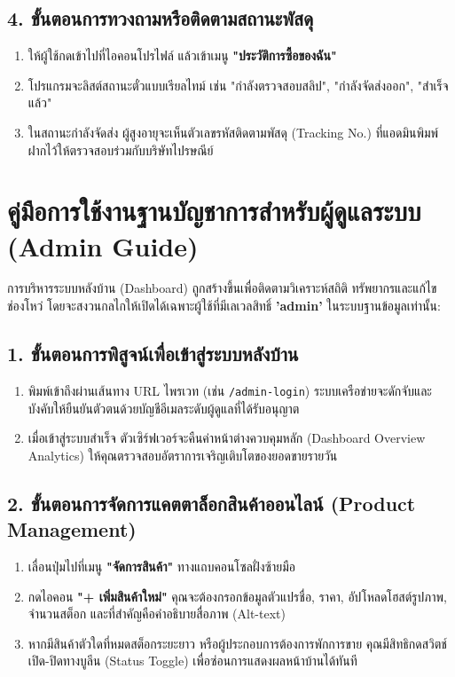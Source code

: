\subsection{4. ขั้นตอนการทวงถามหรือติดตามสถานะพัสดุ}
\begin{enumerate}
    \item ให้ผู้ใช้กดเข้าไปที่ไอคอนโปรไฟล์ แล้วเข้าเมนู \textbf{"ประวัติการซื้อของฉัน"}
    \item โปรแกรมจะลิสต์สถานะตั๋วแบบเรียลไทม์ เช่น "กำลังตรวจสอบสลิป", "กำลังจัดส่งออก", "สำเร็จแล้ว" 
    \item ในสถานะกำลังจัดส่ง ผู้สูงอายุจะเห็นตัวเลขรหัสติดตามพัสดุ (Tracking No.) ที่แอดมินพิมพ์ฝากไว้ให้ตรวจสอบร่วมกับบริษัทไปรษณีย์
\end{enumerate}

\section{คู่มือการใช้งานฐานบัญชาการสำหรับผู้ดูแลระบบ (Admin Guide)}
การบริหารระบบหลังบ้าน (Dashboard) ถูกสร้างขึ้นเพื่อติดตามวิเคราะห์สถิติ ทรัพยากรและแก้ไขช่องโหว่ โดยจะสงวนกลไกให้เปิดได้เฉพาะผู้ใช้ที่มีเลเวลสิทธิ์ \textbf{'admin'} ในระบบฐานข้อมูลเท่านั้น:

\subsection{1. ขั้นตอนการพิสูจน์เพื่อเข้าสู่ระบบหลังบ้าน}
\begin{enumerate}
    \item พิมพ์เข้าถึงผ่านเส้นทาง URL ไพรเวท (เช่น \texttt{/admin-login}) ระบบเครือข่ายจะดักจับและบังคับให้ยืนยันตัวตนด้วยบัญชีอีเมลระดับผู้ดูแลที่ได้รับอนุญาต
    \item เมื่อเข้าสู่ระบบสำเร็จ ตัวเซิร์ฟเวอร์จะคืนค่าหน้าต่างควบคุมหลัก (Dashboard Overview Analytics) ให้คุณตรวจสอบอัตราการเจริญเติบโตของยอดขายรายวัน 
\end{enumerate}

\subsection{2. ขั้นตอนการจัดการแคตตาล็อกสินค้าออนไลน์ (Product Management)}
\begin{enumerate}
    \item เลื่อนปุ่มไปที่เมนู \textbf{"จัดการสินค้า"} ทางแถบคอนโซลฝั่งซ้ายมือ
    \item กดไอคอน \textbf{"+ เพิ่มสินค้าใหม่"} คุณจะต้องกรอกข้อมูลตัวแปรชื่อ, ราคา, อัปโหลดโฮสต์รูปภาพ, จำนวนสต็อก และที่สำคัญคือคำอธิบายสื่อภาพ (Alt-text)
    \item หากมีสินค้าตัวใดที่หมดสต็อกระยะยาว หรือผู้ประกอบการต้องการพักการขาย คุณมีสิทธิกดสวิตช์เปิด-ปิดทางบูลีน (Status Toggle) เพื่อซ่อนการแสดงผลหน้าบ้านได้ทันที
\end{enumerate}

